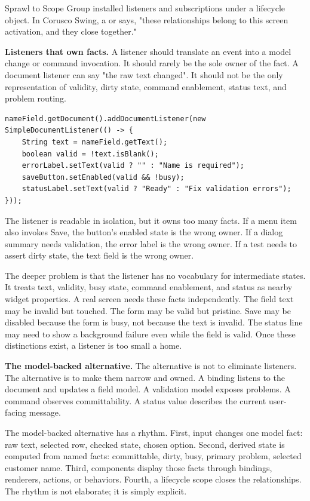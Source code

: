 \begin{migrationbox}{Sprawl to Scope}
Group installed listeners and subscriptions under a lifecycle object. In Corusco Swing, a  or  says, "these relationships belong to this screen activation, and they close together."
\end{migrationbox}

\textbf{Listeners that own facts.}
A listener should translate an event into a model change or command invocation. It should rarely be the sole owner of the fact. A document listener can say "the raw text changed". It should not be the only representation of validity, dirty state, command enablement, status text, and problem routing.

\begin{lstlisting}[caption={A listener that has accumulated too many jobs.}]
nameField.getDocument().addDocumentListener(new SimpleDocumentListener(() -> {
    String text = nameField.getText();
    boolean valid = !text.isBlank();
    errorLabel.setText(valid ? "" : "Name is required");
    saveButton.setEnabled(valid && !busy);
    statusLabel.setText(valid ? "Ready" : "Fix validation errors");
}));
\end{lstlisting}

The listener is readable in isolation, but it owns too many facts. If a menu item also invokes Save, the button's enabled state is the wrong owner. If a dialog summary needs validation, the error label is the wrong owner. If a test needs to assert dirty state, the text field is the wrong owner.

The deeper problem is that the listener has no vocabulary for intermediate
states. It treats text, validity, busy state, command enablement, and status as
nearby widget properties. A real screen needs these facts independently. The
field text may be invalid but touched. The form may be valid but pristine. Save
may be disabled because the form is busy, not because the text is invalid. The
status line may need to show a background failure even while the field is valid.
Once these distinctions exist, a listener is too small a home.

\textbf{The model-backed alternative.}
The alternative is not to eliminate listeners. The alternative is to make them narrow and owned. A binding listens to the document and updates a field model. A validation model exposes problems. A command observes committability. A status value describes the current user-facing message.

The model-backed alternative has a rhythm. First, input changes one model fact:
raw text, selected row, checked state, chosen option. Second, derived state is
computed from named facts: committable, dirty, busy, primary problem, selected
customer name. Third, components display those facts through bindings,
renderers, actions, or behaviors. Fourth, a lifecycle scope closes the
relationships. The rhythm is not elaborate; it is simply explicit.

